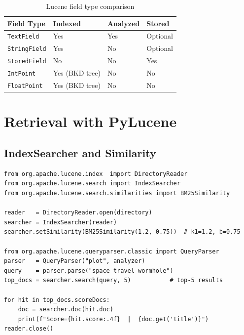 \documentclass[11pt,a4paper]{article}
\begin{document}
\begin{table}[h]
\centering
\small
\begin{tabular}{@{}llll@{}}
\toprule
\textbf{Field Type} & \textbf{Indexed} & \textbf{Analyzed} & \textbf{Stored} \\
\midrule
\texttt{TextField}   & Yes & Yes & Optional \\
\texttt{StringField} & Yes & No  & Optional \\
\texttt{StoredField} & No  & No  & Yes      \\
\texttt{IntPoint}    & Yes (BKD tree) & No & No \\
\texttt{FloatPoint}  & Yes (BKD tree) & No & No \\
\bottomrule
\end{tabular}
\caption{Lucene field type comparison}
\label{tab:fields}
\end{table}

\section{Retrieval with PyLucene}

\subsection{IndexSearcher and Similarity}

\begin{lstlisting}[caption={Setting up IndexSearcher with BM25 (from \texttt{src/pylucene/retrieval.py})}]
from org.apache.lucene.index  import DirectoryReader
from org.apache.lucene.search import IndexSearcher
from org.apache.lucene.search.similarities import BM25Similarity

reader   = DirectoryReader.open(directory)
searcher = IndexSearcher(reader)
searcher.setSimilarity(BM25Similarity(1.2, 0.75))  # k1=1.2, b=0.75

from org.apache.lucene.queryparser.classic import QueryParser
parser   = QueryParser("plot", analyzer)
query    = parser.parse("space travel wormhole")
top_docs = searcher.search(query, 5)           # top-5 results

for hit in top_docs.scoreDocs:
    doc = searcher.doc(hit.doc)
    print(f"Score={hit.score:.4f}  |  {doc.get('title')}")
reader.close()
\end{lstlisting}
\end{document}
